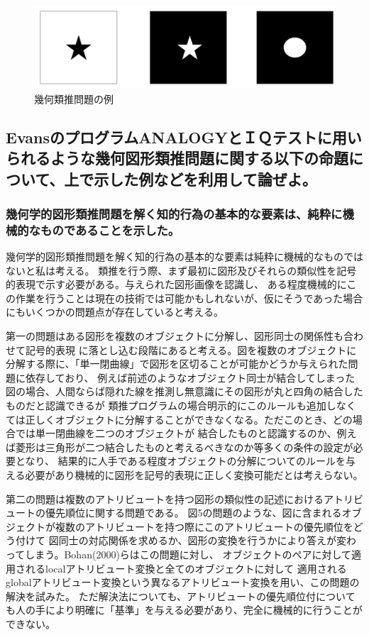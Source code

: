 \documentclass[uplatex]{jsarticle}
\begin{document}
\begin{figure}
  \begin{center}
    \includegraphics[width=13cm]{img/inverse.png}
    \caption{幾何類推問題の例}
  \end{center}
\end{figure}


\subsection{EvansのプログラムANALOGYとＩＱテストに用いられるような幾何図形類推問題に関する以下の命題について、上で示した例などを利用して論ぜよ。}
\subsubsection{幾何学的図形類推問題を解く知的行為の基本的な要素は、純粋に機械的なものであることを示した。}
幾何学的図形類推問題を解く知的行為の基本的な要素は純粋に機械的なものではないと私は考える。
類推を行う際、まず最初に図形及びそれらの類似性を記号的表現で示す必要がある。与えられた図形画像を認識し、
ある程度機械的にこの作業を行うことは現在の技術では可能かもしれないが、仮にそうであった場合にもいくつかの問題点が存在していると考える。

第一の問題はある図形を複数のオブジェクトに分解し、図形同士の関係性も合わせて記号的表現
に落とし込む段階にあると考える。図を複数のオブジェクトに分解する際に、「単一閉曲線」で図形を区切ることが可能かどうか与えられた問題に依存しており、
例えば前述のようなオブジェクト同士が結合してしまった図の場合、人間ならば隠れた線を推測し無意識にその図形が丸と四角の結合したものだと認識できるが
類推プログラムの場合明示的にこのルールも追加しなくては正しくオブジェクトに分解することができなくなる。ただこのとき、どの場合では単一閉曲線を二つのオブジェクトが
結合したものと認識するのか、例えば菱形は三角形が二つ結合したものと考えるべきなのか等多くの条件の設定が必要となり、
結果的に人手である程度オブジェクトの分解についてのルールを与える必要があり機械的に図形を記号的表現に正しく変換可能だとは考えらない。

第二の問題は複数のアトリビュートを持つ図形の類似性の記述におけるアトリビュートの優先順位に関する問題である。
図5の問題のような、図に含まれるオブジェクトが複数のアトリビュートを持つ際にこのアトリビュートの優先順位をどう付けて
図同士の対応関係を求めるか、図形の変換を行うかにより答えが変わってしまう。Bohan(2000)らはこの問題に対し、
オブジェクトのペアに対して適用されるlocalアトリビュート変換と全てのオブジェクトに対して
適用されるglobalアトリビュート変換という異なるアトリビュート変換を用い、この問題の解決を試みた。
ただ解決法についても、アトリビュートの優先順位付についても人の手により明確に「基準」を与える必要があり、完全に機械的に行うことができない。
\end{document}
